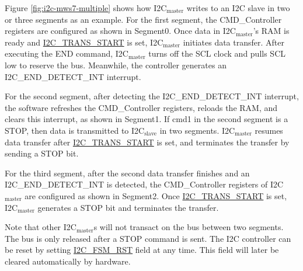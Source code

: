 \documentclass[main\_\_EN.tex]{subfiles}
\begin{document}
Figure \ref{fig:i2c-mws7-multiple} shows how I2C$_\text{master}$ writes to an I2C slave in two or three segments as an example. For the first segment, the CMD\_Controller registers are configured as shown in Segment0. Once data in I2C$_\text{master}$'s RAM is ready and \hyperref[fielddesc:I2CTRANSSTART]{I2C\_TRANS\_START} is set, I2C$_\text{master}$ initiates data transfer. After executing the END command, I2C$_\text{master}$ turns off the SCL clock and pulls SCL low to reserve the bus. Meanwhile, the controller generates an I2C\_END\_DETECT\_INT interrupt.

For the second segment, after detecting the I2C\_END\_DETECT\_INT interrupt, the software refreshes the CMD\_Controller registers, reloads the RAM, and clears this interrupt, as shown in Segment1. If cmd1 in the second segment is a STOP, then data is transmitted to I2C$_\text{slave}$ in two segments. I2C$_\text{master}$ resumes data transfer after \hyperref[fielddesc:I2CTRANSSTART]{I2C\_TRANS\_START} is set, and terminates the transfer by sending a STOP bit.

For the third segment, after the second data transfer finishes and an I2C\_END\_DETECT\_INT is detected, the CMD\_Controller registers of I2C$_\text{master}$ are configured as shown in Segment2. Once \hyperref[fielddesc:I2CTRANSSTART]{I2C\_TRANS\_START} is set, I2C$_\text{master}$ generates a STOP bit and terminates the transfer.

Note that other I2C$_\text{master}$s will not transact on the bus between two segments. The bus is only released after a STOP command is sent. The I2C controller can be reset by setting \hyperref[fielddesc:I2CFSMRST]{I2C\_FSM\_RST} field at any time. This field will later be cleared automatically by hardware.
\end{document}
